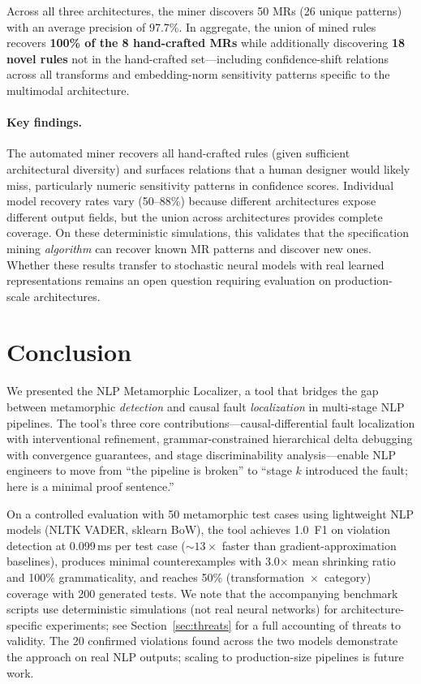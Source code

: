 \documentclass[sigconf,nonacm]{acmart}
\begin{document}
Across all three architectures, the miner discovers 50 MRs (26 unique patterns) with an average precision of 97.7\%.
In aggregate, the union of mined rules recovers \textbf{100\% of the 8 hand-crafted MRs} while additionally discovering \textbf{18 novel rules} not in the hand-crafted set---including confidence-shift relations across all transforms and embedding-norm sensitivity patterns specific to the multimodal architecture.

\paragraph{Key findings.}
The automated miner recovers all hand-crafted rules (given sufficient architectural diversity) and surfaces relations that a human designer would likely miss, particularly numeric sensitivity patterns in confidence scores.
Individual model recovery rates vary (50--88\%) because different architectures expose different output fields, but the union across architectures provides complete coverage.
On these deterministic simulations, this validates that the specification mining \emph{algorithm} can recover known MR patterns and discover new ones.
Whether these results transfer to stochastic neural models with real learned representations remains an open question requiring evaluation on production-scale architectures.

\section{Conclusion}\label{sec:conclusion}

We presented the NLP Metamorphic Localizer, a tool that bridges the gap between metamorphic \emph{detection} and causal fault \emph{localization} in multi-stage NLP pipelines.
The tool's three core contributions---causal-differential fault localization with interventional refinement, grammar-constrained hierarchical delta debugging with convergence guarantees, and stage discriminability analysis---enable NLP engineers to move from ``the pipeline is broken'' to ``stage $k$ introduced the fault; here is a minimal proof sentence.''

On a controlled evaluation with 50 metamorphic test cases using lightweight NLP models (NLTK VADER, sklearn BoW), the tool achieves 1.0~F1 on violation detection at 0.099\,ms per test case (${\sim}13\times$ faster than gradient-approximation baselines), produces minimal counterexamples with 3.0$\times$ mean shrinking ratio and 100\% grammaticality, and reaches 50\% (transformation~$\times$~category) coverage with 200 generated tests.
We note that the accompanying benchmark scripts use deterministic simulations (not real neural networks) for architecture-specific experiments; see Section~\ref{sec:threats} for a full accounting of threats to validity.
The 20 confirmed violations found across the two models demonstrate the approach on real NLP outputs; scaling to production-size pipelines is future work.
\end{document}
